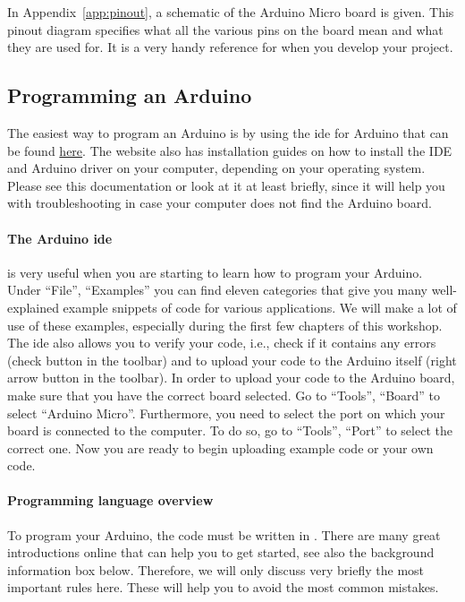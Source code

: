 In Appendix~\ref{app:pinout}, a schematic of the Arduino Micro board is given. This pinout diagram specifies what all the various pins on the board mean and what they are used for. It is a very handy reference for when you develop your project.

\subsection{Programming an Arduino}

The easiest way to program an Arduino is by using the \ac{ide} for Arduino that can be found \href{https://www.arduino.cc/en/software}{here}. The website also has installation guides on how to install the IDE and Arduino driver on your computer, depending on your operating system. Please see this documentation or look at it at least briefly, since it will help you with troubleshooting in case your computer does not find the Arduino board.

\paragraph{The Arduino \ac{ide}} is very useful when you are starting to learn how to program your Arduino. Under ``File'', ``Examples'' you can find eleven categories that give you many well-explained example snippets of code for various applications. We will make a lot of use of these examples, especially during the first few chapters of this workshop. The \ac{ide} also allows you to verify your code, i.e., check if it contains any errors (check button in the toolbar) and to upload your code to the Arduino itself (right arrow button in the toolbar). In order to upload your code to the Arduino board, make sure that you have the correct board selected. Go to ``Tools'', ``Board'' to select ``Arduino Micro''. Furthermore, you need to select the port on which your board is connected to the computer. To do so, go to ``Tools'', ``Port'' to select the correct one. Now you are ready to begin uploading example code or your own code.

\paragraph{Programming language overview} To program your Arduino, the code must be written in \cpp. There are many great introductions online that can help you to get started, see also the background information box below. Therefore, we will only discuss very briefly the most important rules here. These will help you to avoid the most common mistakes.

